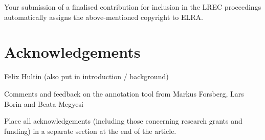 \documentclass[10pt, a4paper]{article}
\newcommand{\secref}[1]{\StrSubstitute{\getrefnumber{#1}}{.}{ }}
\begin{document}
Your submission of a finalised contribution for inclusion in the LREC
proceedings automatically assigns the above-mentioned copyright to ELRA.

\section{Acknowledgements}

Felix Hultin \cite{correctAnnotator} (also put in introduction / background)

Comments and feedback on the annotation tool from
Markus Forsberg, Lars Borin and Beata Megyesi

Place all acknowledgements (including those concerning research grants and
funding) in a separate section at the end of the article.

\end{document}
